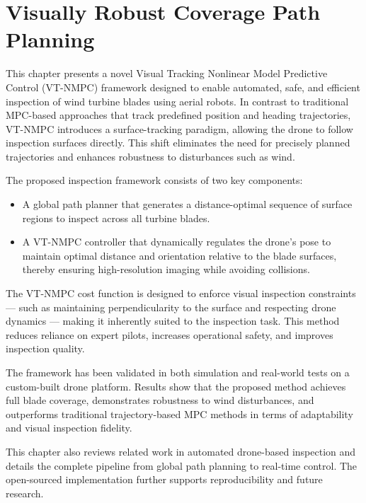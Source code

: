 \chapter{Visually Robust Coverage Path Planning}

This chapter presents a novel Visual Tracking Nonlinear Model Predictive Control (VT-NMPC) framework designed to enable automated, safe, and efficient inspection of wind turbine blades using aerial robots. In contrast to traditional MPC-based approaches that track predefined position and heading trajectories, VT-NMPC introduces a surface-tracking paradigm, allowing the drone to follow inspection surfaces directly. This shift eliminates the need for precisely planned trajectories and enhances robustness to disturbances such as wind.

The proposed inspection framework consists of two key components:
\begin{itemize}
    
\item A global path planner that generates a distance-optimal sequence of surface regions to inspect across all turbine blades.

\item  A VT-NMPC controller that dynamically regulates the drone’s pose to maintain optimal distance and orientation relative to the blade surfaces, thereby ensuring high-resolution imaging while avoiding collisions.

\end{itemize}

The VT-NMPC cost function is designed to enforce visual inspection constraints — such as maintaining perpendicularity to the surface and respecting drone dynamics — making it inherently suited to the inspection task. This method reduces reliance on expert pilots, increases operational safety, and improves inspection quality.

The framework has been validated in both simulation and real-world tests on a custom-built drone platform. Results show that the proposed method achieves full blade coverage, demonstrates robustness to wind disturbances, and outperforms traditional trajectory-based MPC methods in terms of adaptability and visual inspection fidelity.

This chapter also reviews related work in automated drone-based inspection and details the complete pipeline from global path planning to real-time control. The open-sourced implementation further supports reproducibility and future research.